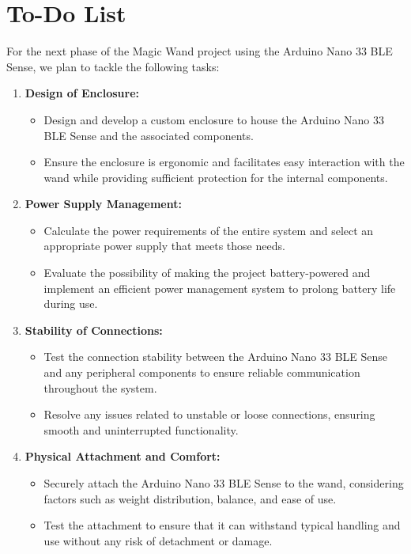 \section{To-Do List}

For the next phase of the Magic Wand project using the Arduino Nano 33 BLE Sense, we plan to tackle the following tasks:

\begin{enumerate}
	
	\item \textbf{Design of Enclosure:}
	
	\begin{itemize}
		\item Design and develop a custom enclosure to house the Arduino Nano 33 BLE Sense and the associated components.
		\item Ensure the enclosure is ergonomic and facilitates easy interaction with the wand while providing sufficient protection for the internal components.
	\end{itemize}
	
	\item \textbf{Power Supply Management:}
	
	\begin{itemize}
		\item Calculate the power requirements of the entire system and select an appropriate power supply that meets those needs.
		\item Evaluate the possibility of making the project battery-powered and implement an efficient power management system to prolong battery life during use.
	\end{itemize}
	
	\item \textbf{Stability of Connections:}
	
	\begin{itemize}
		\item Test the connection stability between the Arduino Nano 33 BLE Sense and any peripheral components to ensure reliable communication throughout the system.
		\item Resolve any issues related to unstable or loose connections, ensuring smooth and uninterrupted functionality.
	\end{itemize}
	
	\item \textbf{Physical Attachment and Comfort:}
	
	\begin{itemize}
		\item Securely attach the Arduino Nano 33 BLE Sense to the wand, considering factors such as weight distribution, balance, and ease of use.
		\item Test the attachment to ensure that it can withstand typical handling and use without any risk of detachment or damage.
	\end{itemize}
	

\end{enumerate}

